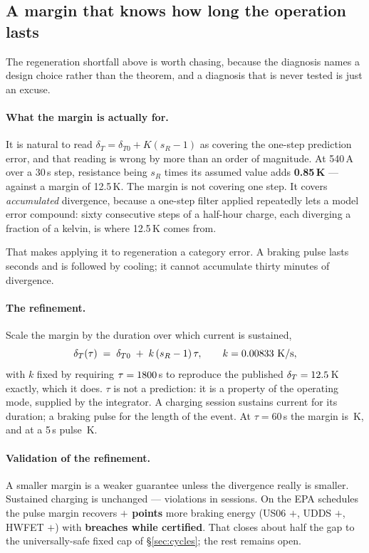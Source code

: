 \documentclass[11pt,letterpaper]{article}
\theoremstyle{definition}
\theoremstyle{remark}
\begin{document}
\subsection{A margin that knows how long the operation lasts}\label{sec:durmargin}

The regeneration shortfall above is worth chasing, because the diagnosis names a design choice
rather than the theorem, and a diagnosis that is never tested is just an excuse.

\paragraph{What the margin is actually for.} It is natural to read
$\delta_T = \delta_{T0} + K(s_R-1)$ as covering the one-step prediction error, and that reading
is wrong by more than an order of magnitude. At 540\,A over a 30\,s step, resistance being $s_R$
times its assumed value adds \textbf{0.85\,K} --- against a margin of 12.5\,K. The margin is not
covering one step. It covers \emph{accumulated} divergence, because a one-step filter applied
repeatedly lets a model error compound: sixty consecutive steps of a half-hour charge, each
diverging a fraction of a kelvin, is where 12.5\,K comes from.

That makes applying it to regeneration a category error. A braking pulse lasts seconds and is
followed by cooling; it cannot accumulate thirty minutes of divergence.

\paragraph{The refinement.} Scale the margin by the duration over which current is sustained,
\begin{equation}
\delta_T(\tau) \;=\; \delta_{T0} \;+\; k\,(s_R-1)\,\tau, \qquad
k = 0.00833\ \mathrm{K/s},
\end{equation}
with $k$ fixed by requiring $\tau = 1800$\,s to reproduce the published $\delta_T =
12.5$\,K exactly, which it does. $\tau$ is not a prediction: it is a property of the
operating mode, supplied by the integrator. A charging session sustains current for its
duration; a braking pulse for the length of the event. At $\tau = 60$\,s the margin is
\mMarginMinute\,K, and at a 5\,s pulse \mMarginPulse\,K.

\paragraph{Validation of the refinement.} A smaller margin is a weaker guarantee unless the
divergence really is smaller. Sustained charging is unchanged --- \mChargeViol{} violations in
\mChargeTrials{} sessions. On the EPA schedules the pulse margin recovers
\textbf{$+$\mRegenGain{} points} more braking energy (US06 $+$\mGainUSsix{}, UDDS
$+$\mGainUdds{}, HWFET $+$\mGainHwfet{}) with \textbf{\mRegenBreach{} breaches while
certified}. That closes about half the gap to the universally-safe fixed cap of
\S\ref{sec:cycles}; the rest remains open.
\end{document}
